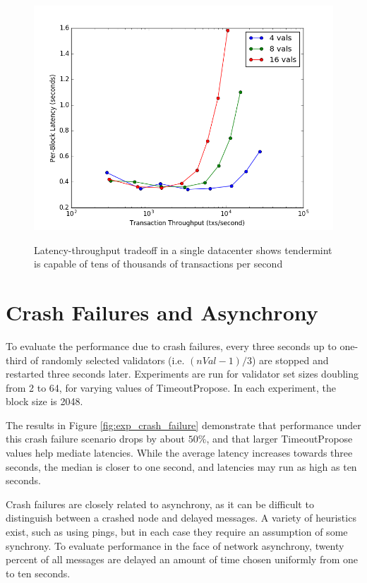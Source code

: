 \begin{figure}[]
	\includegraphics[width=\linewidth,height=\textheight,keepaspectratio]{figures/single_datacenter/latency-throughput.png}
    	\centering
	\label{fig:exp:single}
	\caption[Latency-throughput in non-faulty network, single data center]{Latency-throughput tradeoff in a single datacenter shows tendermint is capable of tens of thousands of transactions per second}
\end{figure}

\section{Crash Failures and Asynchrony}

To evaluate the performance due to crash failures, every three seconds up to one-third of randomly selected validators
(i.e. $(nVal - 1) / 3$) are stopped and restarted three seconds later.
Experiments are run for validator set sizes doubling from 2 to 64, for varying values of TimeoutPropose.
In each experiment, the block size is 2048.

The results in Figure \ref{fig:exp_crash_failure} demonstrate that performance under this crash failure scenario drops by about 
$50\%$, and that larger TimeoutPropose values help mediate latencies. While the average latency increases towards three seconds,
the median is closer to one second, and latencies may run as high as ten seconds.

Crash failures are closely related to asynchrony, as it can be difficult to distinguish between a crashed node
and delayed messages. A variety of heuristics exist, such as using pings, 
but in each case they require an assumption of some synchrony. 
To evaluate performance in the face of network asynchrony, twenty percent of all messages are delayed an amount of time chosen uniformly 
from one to ten seconds.


